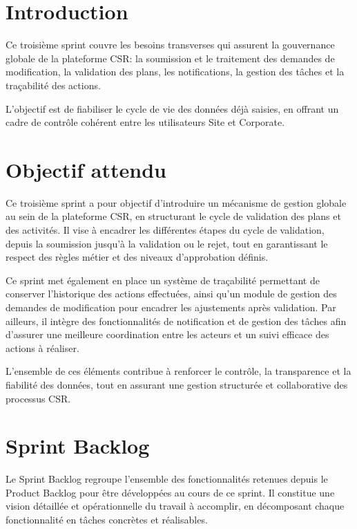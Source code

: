 
\section{Introduction}

Ce troisième sprint couvre les besoins transverses qui assurent la gouvernance globale de la plateforme CSR:
la soumission et le traitement des demandes de modification, la validation des plans, les notifications,
la gestion des tâches et la traçabilité des actions.

L'objectif est de fiabiliser le cycle de vie des données déjà saisies, en offrant un cadre de contrôle
cohérent entre les utilisateurs Site et Corporate.

\section{Objectif attendu}

Ce troisième sprint a pour objectif d'introduire un mécanisme de gestion globale au sein de la plateforme CSR, en structurant le cycle de validation des plans et des activités.
Il vise à encadrer les différentes étapes du cycle de validation, depuis la soumission jusqu'à la validation ou le rejet, tout en garantissant le respect des règles métier et des niveaux d'approbation définis.

Ce sprint met également en place un système de traçabilité permettant de conserver l'historique des actions effectuées, ainsi qu'un module de gestion des demandes de modification pour encadrer les ajustements après validation.
Par ailleurs, il intègre des fonctionnalités de notification et de gestion des tâches afin d'assurer une meilleure coordination entre les acteurs et un suivi efficace des actions à réaliser.

L'ensemble de ces éléments contribue à renforcer le contrôle, la transparence et la fiabilité des données, tout en assurant une gestion structurée et collaborative des processus CSR.

\section{Sprint Backlog}

Le Sprint Backlog regroupe l'ensemble des fonctionnalités retenues depuis le Product Backlog pour être développées au cours de ce sprint. Il constitue une vision détaillée et opérationnelle du travail à accomplir, en décomposant chaque fonctionnalité en tâches concrètes et réalisables.

